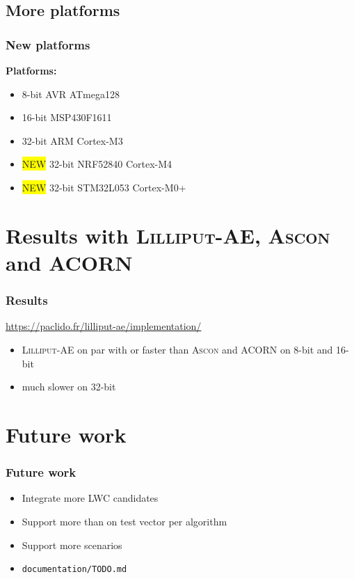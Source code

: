 \documentclass[english]{beamer}
\newcommand{\bgyellow}[1]{\colorbox{yellow}{#1}}
\begin{document}
\subsection{More platforms}

\begin{frame}
  \frametitle{New platforms}

  \textbf{Platforms:}
  \begin{itemize}
  \item 8-bit AVR ATmega128
  \item 16-bit MSP430F1611
  \item 32-bit ARM Cortex-M3
    \pause
  \item \bgyellow{NEW} 32-bit NRF52840 Cortex-M4
  \item \bgyellow{NEW} 32-bit STM32L053 Cortex-M0+
  \end{itemize}

\end{frame}

\section[Results]{Results with \textsc{Lilliput-AE}, \textsc{Ascon} and ACORN}

\begin{frame}
  \frametitle{Results}

  \url{https://paclido.fr/lilliput-ae/implementation/}

  \begin{itemize}
  \item \textsc{Lilliput-AE} on par with or faster than \textsc{Ascon} and ACORN on 8-bit and 16-bit
  \item much slower on 32-bit
  \end{itemize}

\end{frame}

\section[Future work]{Future work}

\begin{frame}
  \frametitle{Future work}

  \begin{itemize}
  \item Integrate more LWC candidates
  \item Support more than on test vector per algorithm
  \item Support more scenarios
  \item \texttt{documentation/TODO.md}
  \end{itemize}

\end{frame}
\end{document}
